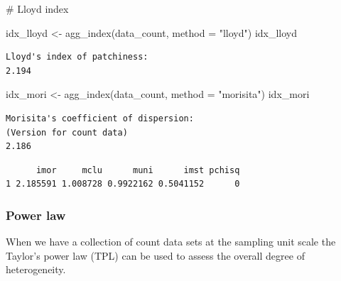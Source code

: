 \documentclass[
  letterpaper,
]{book}
\newenvironment{Shaded}{\begin{snugshade}}{\end{snugshade}}
\newcommand{\AttributeTok}[1]{\textcolor[rgb]{0.40,0.45,0.13}{#1}}
\newcommand{\CommentTok}[1]{\textcolor[rgb]{0.37,0.37,0.37}{#1}}
\newcommand{\FunctionTok}[1]{\textcolor[rgb]{0.28,0.35,0.67}{#1}}
\newcommand{\NormalTok}[1]{\textcolor[rgb]{0.00,0.23,0.31}{#1}}
\newcommand{\OtherTok}[1]{\textcolor[rgb]{0.00,0.23,0.31}{#1}}
\newcommand{\SpecialCharTok}[1]{\textcolor[rgb]{0.37,0.37,0.37}{#1}}
\newcommand{\StringTok}[1]{\textcolor[rgb]{0.13,0.47,0.30}{#1}}
\begin{document}
\begin{Shaded}
\begin{Highlighting}[]
\CommentTok{\# Lloyd index}

\NormalTok{idx\_lloyd }\OtherTok{\textless{}{-}} \FunctionTok{agg\_index}\NormalTok{(data\_count, }\AttributeTok{method =} \StringTok{"lloyd"}\NormalTok{)}
\NormalTok{idx\_lloyd}
\end{Highlighting}
\end{Shaded}

\begin{verbatim}
Lloyd's index of patchiness:
2.194
\end{verbatim}

\begin{Shaded}
\begin{Highlighting}[]
\NormalTok{idx\_mori }\OtherTok{\textless{}{-}} \FunctionTok{agg\_index}\NormalTok{(data\_count, }\AttributeTok{method =} \StringTok{"morisita"}\NormalTok{)}
\NormalTok{idx\_mori}
\end{Highlighting}
\end{Shaded}

\begin{verbatim}
Morisita's coefficient of dispersion:
(Version for count data)
2.186
\end{verbatim}

\begin{Shaded}
\end{Shaded}

\begin{verbatim}
      imor     mclu      muni      imst pchisq
1 2.185591 1.008728 0.9922162 0.5041152      0
\end{verbatim}

\hypertarget{power-law}{%
\subsubsection{Power law}\label{power-law}}

When we have a collection of count data sets at the sampling unit scale
the Taylor's power law (TPL) can be used to assess the overall degree of
heterogeneity.
\end{document}
